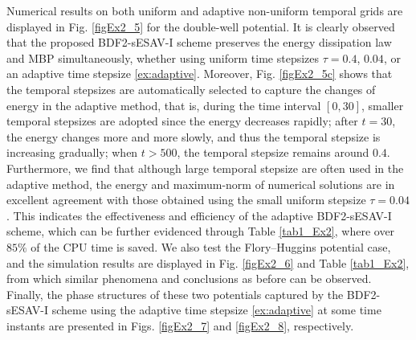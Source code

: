 \documentclass{m2an}
\begin{document}
Numerical results on both uniform and adaptive non-uniform temporal grids are displayed in Fig. \ref{figEx2_5} for the double-well potential. It is clearly observed that the proposed BDF2-sESAV-I scheme preserves the energy dissipation law and MBP simultaneously, whether using uniform time stepsizes $\tau = 0.4$, $0.04$, or an adaptive time stepsize \eqref{ex:adaptive}. Moreover, Fig. \ref{figEx2_5c} shows that the temporal stepsizes are automatically selected to capture the changes of energy in the adaptive method, that is, during the time interval $ [ 0, 30 ] $, smaller temporal stepsizes are adopted since the energy decreases rapidly; after $ t = 30 $, the energy changes more and more slowly, and thus the temporal stepsize is increasing gradually; when $ t > 500 $, the temporal stepsize remains around $ 0.4 $. Furthermore, we find that although large temporal stepsize are often used in the adaptive method, the energy and maximum-norm of numerical solutions are in excellent agreement with those obtained using the small uniform stepsize $\tau = 0.04$. This indicates the effectiveness and efficiency of the adaptive BDF2-sESAV-I scheme, which can be further evidenced through Table \ref{tab1_Ex2}, where over $ 85 \% $ of the CPU time is saved. We also test the Flory–Huggins potential case, and the simulation results are displayed in Fig. \ref{figEx2_6} and Table \ref{tab1_Ex2}, from which similar phenomena and conclusions as before can be observed. Finally, the phase structures of these two potentials captured by the BDF2-sESAV-I scheme using the adaptive time stepsize \eqref{ex:adaptive} at some time instants are presented in Figs. \ref{figEx2_7} and \ref{figEx2_8}, respectively.
\end{document}
